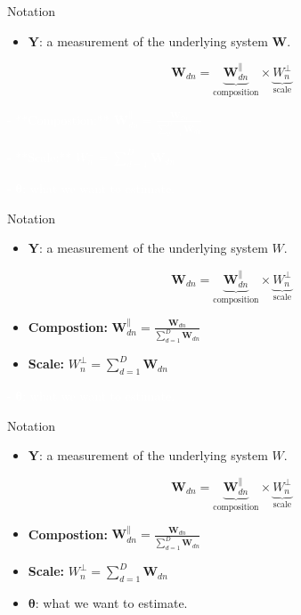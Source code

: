 \documentclass[
  ignorenonframetext,
]{beamer}
\providecommand{\tightlist}{%
  \setlength{\itemsep}{0pt}\setlength{\parskip}{0pt}}
\begin{document}
\begin{frame}{Notation}
\protect\hypertarget{notation}{}
\begin{itemize}
\tightlist
\item
  \(\mathbf{Y}\): a measurement of the underlying system \(\mathbf{W}\).
\end{itemize}

\[\mathbf{W}_{dn} = \underbrace{\mathbf{W}_{dn}^\parallel}_{\text{composition}} \times  \underbrace{W_n^\perp}_{\text{scale}}\]

\textcolor{white}{- **Compostion:** $\mathbf{W}_{dn}^\parallel = \frac{\mathbf{W}_{dn}}{\sum_{d=1}^D \mathbf{W}_{dn}}$}

\textcolor{white}{- **Scale:** $W_n^\perp = \sum_{d=1}^D \mathbf{W}_{dn}$}

\textcolor{white}{- $\boldsymbol{\theta}$: what we want to estimate.}
\end{frame}

\begin{frame}{Notation}
\protect\hypertarget{notation-1}{}
\begin{itemize}
\tightlist
\item
  \(\mathbf{Y}\): a measurement of the underlying system \(W\).
\end{itemize}

\[\mathbf{W}_{dn} = \underbrace{\mathbf{W}_{dn}^\parallel}_{\text{composition}} \times  \underbrace{W_n^\perp}_{\text{scale}}\]

\begin{itemize}
\item
  \textbf{Compostion:}
  \(\mathbf{W}_{dn}^\parallel = \frac{\mathbf{W}_{dn}}{\sum_{d=1}^D \mathbf{W}_{dn}}\)
\item
  \textbf{Scale:} \(W_n^\perp = \sum_{d=1}^D \mathbf{W}_{dn}\)
\end{itemize}

\textcolor{white}{- $\boldsymbol{\theta}$: what we want to estimate.}
\end{frame}

\begin{frame}{Notation}
\protect\hypertarget{notation-2}{}
\begin{itemize}
\tightlist
\item
  \(\mathbf{Y}\): a measurement of the underlying system \(W\).
\end{itemize}

\[\mathbf{W}_{dn} = \underbrace{\mathbf{W}_{dn}^\parallel}_{\text{composition}} \times  \underbrace{W_n^\perp}_{\text{scale}}\]

\begin{itemize}
\item
  \textbf{Compostion:}
  \(\mathbf{W}_{dn}^\parallel = \frac{\mathbf{W}_{dn}}{\sum_{d=1}^D \mathbf{W}_{dn}}\)
\item
  \textbf{Scale:} \(W_n^\perp = \sum_{d=1}^D \mathbf{W}_{dn}\)
\item
  \(\boldsymbol{\theta}\): what we want to estimate.
\end{itemize}
\end{frame}
\end{document}
